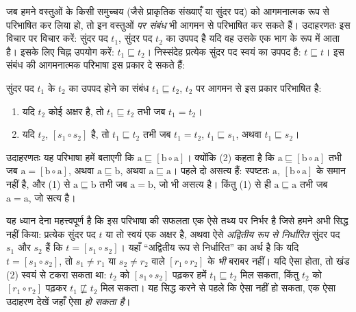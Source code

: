 \documentclass[../../../include/open-logic-section]{subfiles}
\begin{document}


जब हमने वस्तुओं के किसी समुच्चय (जैसे प्राकृतिक संख्याएँ या सुंदर पद)
को आगमनात्मक रूप से परिभाषित कर लिया हो, तो इन वस्तुओं \emph{पर संबंध} भी
आगमन से परिभाषित कर सकते हैं। उदाहरणतः इस विचार पर विचार करें: सुंदर पद
$t_1$, सुंदर पद $t_2$ का उपपद है यदि वह उसके एक भाग के रूप में आता है। इसके
लिए चिह्न उपयोग करें: $t_1\sqsubseteq t_2$। निस्संदेह प्रत्येक सुंदर पद
स्वयं का उपपद है: $t\sqsubseteq t$। इस संबंध की आगमनात्मक परिभाषा इस प्रकार
दे सकते हैं:

\begin{defn}
  सुंदर पद $t_1$ के $t_2$ का उपपद होने का संबंध $t_1\sqsubseteq t_2$,
  $t_2$ पर आगमन से इस प्रकार परिभाषित है:
  \begin{enumerate}
  \item यदि $t_2$ कोई अक्षर है, तो $t_1\sqsubseteq t_2$ तभी जब $t_1=t_2$।
  \item यदि $t_2$, $[s_1\circ s_2]$ है, तो $t_1\sqsubseteq t_2$ तभी जब
    $t_1=t_2$, $t_1\sqsubseteq s_1$, अथवा $t_1\sqsubseteq s_2$।
  \end{enumerate}
\end{defn}

उदाहरणतः यह परिभाषा हमें बताएगी कि
$\mathrm{a}\sqsubseteq[\mathrm{b}\circ\mathrm{a}]$। क्योंकि (2) कहता है
कि $\mathrm{a}\sqsubseteq[\mathrm{b}\circ\mathrm{a}]$ तभी जब
$\mathrm{a}=[\mathrm{b}\circ\mathrm{a}]$, अथवा
$\mathrm{a}\sqsubseteq\mathrm{b}$, अथवा
$\mathrm{a}\sqsubseteq\mathrm{a}$। पहले दो असत्य हैं: स्पष्टतः
$\mathrm{a}$, $[\mathrm{b}\circ\mathrm{a}]$ के समान नहीं है, और (1) से
$\mathrm{a}\sqsubseteq\mathrm{b}$ तभी जब $\mathrm{a}=\mathrm{b}$, जो भी
असत्य है। किंतु (1) से ही $\mathrm{a}\sqsubseteq\mathrm{a}$ तभी जब
$\mathrm{a}=\mathrm{a}$, जो सत्य है।

यह ध्यान देना महत्त्वपूर्ण है कि इस परिभाषा की सफलता एक ऐसे तथ्य पर निर्भर
है जिसे हमने अभी सिद्ध नहीं किया: प्रत्येक सुंदर पद $t$ या तो स्वयं एक
अक्षर है, अथवा ऐसे \emph{अद्वितीय रूप से निर्धारित} सुंदर पद $s_1$ और $s_2$
हैं कि $t=[s_1\circ s_2]$। यहाँ ``अद्वितीय रूप से निर्धारित'' का अर्थ है
कि यदि $t=[s_1\circ s_2]$, तो $s_1\neq r_1$ या $s_2\neq r_2$ वाले
$[r_1\circ r_2]$ के \emph{भी} बराबर नहीं। यदि ऐसा होता, तो खंड (2) स्वयं
से टकरा सकता था: $t_2$ को $[s_1\circ s_2]$ पढ़कर हमें
$t_1\sqsubseteq t_2$ मिल सकता, किंतु $t_2$ को $[r_1\circ r_2]$ पढ़कर
$t_1\not\sqsubseteq t_2$ मिल सकता। यह सिद्ध करने से पहले कि ऐसा नहीं हो
सकता, एक ऐसा उदाहरण देखें जहाँ ऐसा \emph{हो सकता है}।
\end{document}
